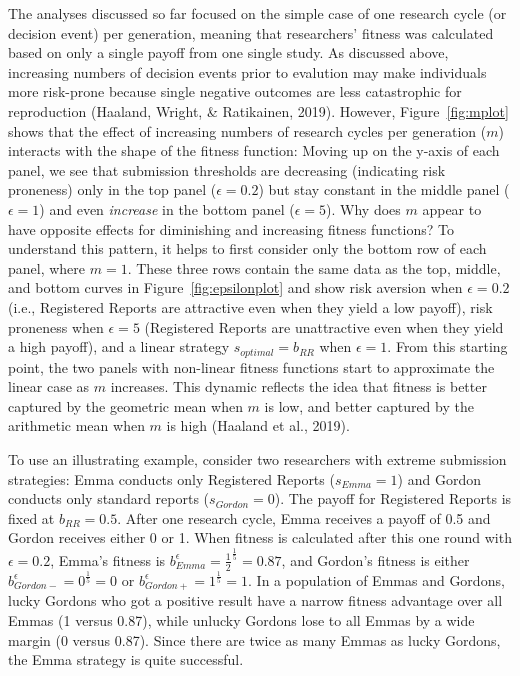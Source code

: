 \documentclass[british,,man,floatsintext]{apa6}
\begin{document}
The analyses discussed so far focused on the simple case of one research cycle (or decision event) per generation, meaning that researchers' fitness was calculated based on only a single payoff from one single study.
As discussed above, increasing numbers of decision events prior to evalution may make individuals more risk-prone because single negative outcomes are less catastrophic for reproduction (Haaland, Wright, \& Ratikainen, 2019).
However, Figure~\ref{fig:mplot} shows that the effect of increasing numbers of research cycles per generation (\(m\)) interacts with the shape of the fitness function:
Moving up on the y-axis of each panel, we see that submission thresholds are decreasing (indicating risk proneness) only in the top panel (\(\epsilon = 0.2\)) but stay constant in the middle panel (\(\epsilon = 1\)) and even \emph{increase} in the bottom panel (\(\epsilon = 5\)).
Why does \(m\) appear to have opposite effects for diminishing and increasing fitness functions?
To understand this pattern, it helps to first consider only the bottom row of each panel, where \(m = 1\).
These three rows contain the same data as the top, middle, and bottom curves in Figure~\ref{fig:epsilonplot} and show risk aversion when \(\epsilon = 0.2\) (i.e., Registered Reports are attractive even when they yield a low payoff), risk proneness when \(\epsilon = 5\) (Registered Reports are unattractive even when they yield a high payoff), and a linear strategy \(s_{optimal} = b_{RR}\) when \(\epsilon = 1\).
From this starting point, the two panels with non-linear fitness functions start to approximate the linear case as \(m\) increases.
This dynamic reflects the idea that fitness is better captured by the geometric mean when \(m\) is low, and better captured by the arithmetic mean when \(m\) is high (Haaland et al., 2019).

To use an illustrating example, consider two researchers with extreme submission strategies:
Emma conducts only Registered Reports (\(s_{Emma} = 1\)) and Gordon conducts only standard reports (\(s_{Gordon} = 0\)).
The payoff for Registered Reports is fixed at \(b_{RR} = 0.5\).
After one research cycle, Emma receives a payoff of 0.5 and Gordon receives either 0 or 1.
When fitness is calculated after this one round with \(\epsilon = 0.2\), Emma's fitness is \(b_{Emma}^{\epsilon} = \frac{1}{2}^{\frac{1}{5}} = 0.87\), and Gordon's fitness is either \(b_{Gordon-}^{\epsilon} = 0^{\frac{1}{5}} = 0\) or \(b_{Gordon+}^{\epsilon} = 1^{\frac{1}{5}} = 1\).
In a population of Emmas and Gordons, lucky Gordons who got a positive result have a narrow fitness advantage over all Emmas (1 versus 0.87), while unlucky Gordons lose to all Emmas by a wide margin (0 versus 0.87).
Since there are twice as many Emmas as lucky Gordons, the Emma strategy is quite successful.
\end{document}
